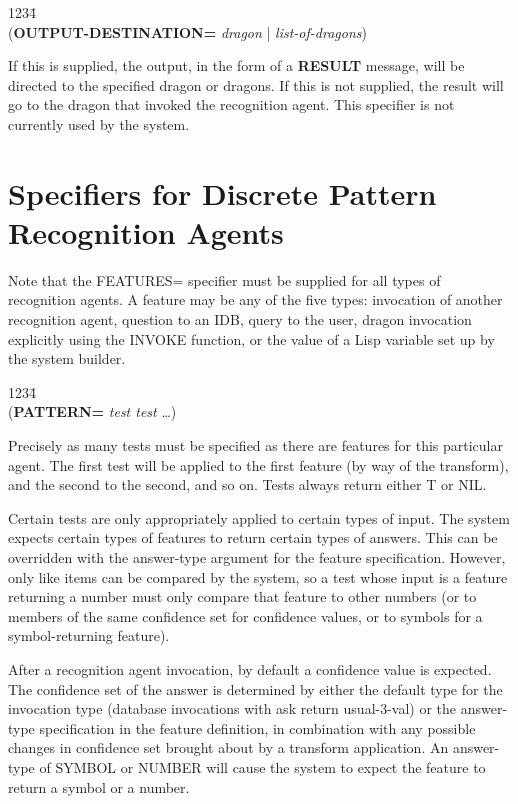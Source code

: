 \begin{tabbing}
1234\= \kill
\\
({\bf OUTPUT-DESTINATION=} {\it dragon\/} | {\it list-of-dragons\/}) \\
\end{tabbing}
If this is supplied, the output, in the form of a {\bf RESULT} message,
will be directed to the specified dragon or dragons.  If this is not
supplied, the result will go to the dragon that invoked the
recognition agent.  This specifier is not currently used by the system.




\section{Specifiers for Discrete Pattern Recognition Agents}

Note that the FEATURES= specifier must be supplied for all types of
recognition agents.  A feature may be any of the five types:
invocation of another recognition agent, question to an IDB, query
to the user, dragon invocation explicitly using the INVOKE function,
or the value of a Lisp variable set up by the system builder.

\begin{tabbing}
1234\= \kill
\\
({\bf PATTERN=} {\it test test\/} \ldots) \\
\end{tabbing}
Precisely as many tests must be specified as there are features for
this particular agent.  The first test will be applied to the first
feature (by way of the transform), and the second to the second, and
so on.  Tests always return either T or NIL.

Certain tests are only appropriately applied to certain types of input.
The system expects certain types of features to return certain types
of answers. This can be overridden with the answer-type argument for
the feature specification. However, only like items can be compared
by the system, so a test whose input is a feature returning a number
must only compare that feature to other numbers (or to members of
the same confidence set for confidence values, or to symbols for
a symbol-returning feature).

After a recognition agent invocation, by default a confidence value is
expected. The confidence set of the answer is determined by either
the default type for the invocation type (database invocations with
ask return usual-3-val) or the answer-type specification in the
feature definition, in combination with any possible changes in
confidence set brought about by a transform application. An
answer-type of SYMBOL or NUMBER will cause the system to expect the
feature to return a symbol or a number. 

